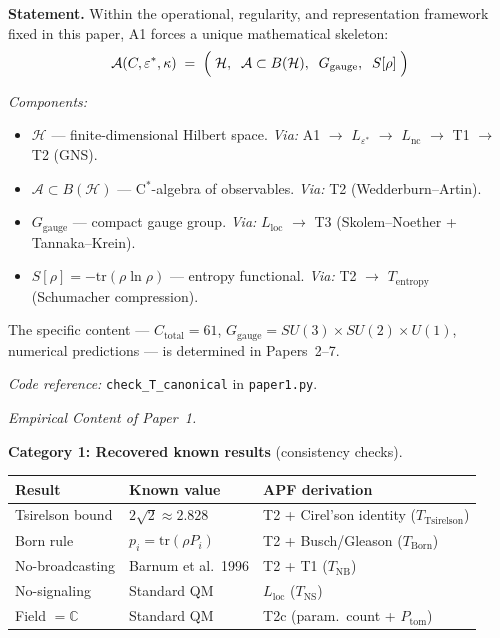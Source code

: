 \documentclass[11pt]{article}
\theoremstyle{remark}
\newenvironment{varlist}{\begin{itemize}[nosep,leftmargin=2em]}{\end{itemize}}
\newcommand{\coderef}[2]{\smallskip\noindent\textit{Code reference:} \texttt{#1} in \texttt{#2}.}
\begin{document}
\begin{tcolorbox}[apfbox, title={$T_{\mathrm{canonical}}$: The Canonical Object Forced by A1}]
\textbf{Statement.}  Within the operational, regularity, and representation framework fixed in this paper, A1 forces a unique mathematical skeleton:
\begin{equation}
\mathcal{A}(C, \varepsilon^*, \kappa) \;=\; \Bigl(\;\mathcal{H},\;\; \mathcal{A} \subset B(\mathcal{H}),\;\; G_{\mathrm{gauge}},\;\; S[\rho]\;\Bigr)
\end{equation}

\smallskip\noindent\textit{Components:}
\begin{varlist}
\item $\mathcal{H}$ --- finite-dimensional Hilbert space. \textit{Via:} A1 $\to$ $L_{\varepsilon^*}$ $\to$ $L_{\mathrm{nc}}$ $\to$ T1 $\to$ T2 (GNS).
\item $\mathcal{A} \subset B(\mathcal{H})$ --- C$^*$-algebra of observables. \textit{Via:} T2 (Wedderburn--Artin).
\item $G_{\mathrm{gauge}}$ --- compact gauge group. \textit{Via:} $L_{\mathrm{loc}}$ $\to$ T3 (Skolem--Noether + Tannaka--Krein).
\item $S[\rho] = -\mathrm{tr}(\rho \ln \rho)$ --- entropy functional. \textit{Via:} T2 $\to$ $T_{\mathrm{entropy}}$ (Schumacher compression).
\end{varlist}

\smallskip
The specific content --- $C_{\mathrm{total}} = 61$, $G_{\mathrm{gauge}} = SU(3) \times SU(2) \times U(1)$, numerical predictions --- is determined in Papers~2--7.

\coderef{check\_T\_canonical}{paper1.py}
\end{tcolorbox}


\medskip\noindent\textit{Empirical Content of Paper~1.}
\label{box:empirical_content}

\medskip\noindent\textbf{Category 1: Recovered known results} (consistency checks).

\begin{center}
\label{tab:empirical_cat1}
\smallskip
\begin{tabular*}{\textwidth}{@{\extracolsep{\fill}}lll@{}}
\textbf{Result} & \textbf{Known value} & \textbf{APF derivation} \\[2pt]
\hline\noalign{\smallskip}
Tsirelson bound & $2\sqrt{2} \approx 2.828$ & T2 + Cirel'son identity ($T_{\mathrm{Tsirelson}}$) \\[3pt]
Born rule & $p_i = \mathrm{tr}(\rho P_i)$ & T2 + Busch/Gleason ($T_{\mathrm{Born}}$) \\[3pt]
No-broadcasting & Barnum et al.\ 1996 & T2 + T1 ($T_{\mathrm{NB}}$) \\[3pt]
No-signaling & Standard QM & $L_{\mathrm{loc}}$ ($T_{\mathrm{NS}}$) \\[3pt]
Field $= \mathbb{C}$ & Standard QM & T2c (param.\ count + $P_{\mathrm{tom}}$) \\
\end{tabular*}
\end{center}
\end{document}
